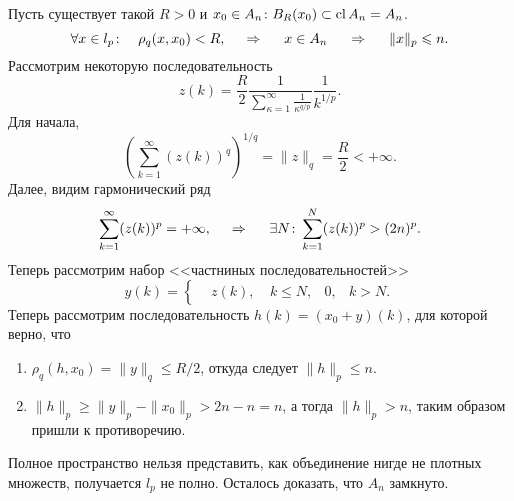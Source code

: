 Пусть существует такой $R > 0$ и $x_0 \in A_n \colon B_R (x_0) \subset \mathop{\mathrm{cl}}\nolimits A_n = A_n$. 
\begin{equation*}
    \forall x \in l_p \colon  \ \ \ 
    \rho_q (x, x_0) < R,
    \hspace{0.5cm} \Rightarrow \hspace{0.5cm}
    x \in A_n \hspace{0.5cm} \Rightarrow \hspace{0.5cm}
    \|x\|_p \leq n.
\end{equation*}
Рассмотрим некоторую последовательность
\begin{equation*}
    z(k) = \frac{R}{2} \frac{1}{\sum_{\kappa=1}^{\infty} \frac{1}{\kappa^{q/p}}} \frac{1}{k^{1/p}}.
\end{equation*}
Для начала,
\begin{equation*}
    \left(
        \sum_{k=1}^{\infty} (z(k))^{q}
    \right)^{1/q} = \|z\|_q = \frac{R}{2} < + \infty.
\end{equation*}
Далее, видим гармонический ряд
\begin{equation*}
    \sum_{k=1}^{\infty} (z(k))^p = + \infty,
    \hspace{0.5cm} \Rightarrow \hspace{0.5cm}
    \exists N  \colon  \sum_{k=1}^{N} (z(k))^p > (2n)^p.
\end{equation*}
Теперь рассмотрим набор <<частниных последовательностей>>
\begin{equation*}
    y(k) = \left\{\begin{aligned}
        &z(k), \ &k \leq N,
        &0, &k > N.
    \end{aligned}\right.
\end{equation*}
Теперь рассмотрим последовательность $h(k) = (x_0 + y) (k)$, для которой верно, что
\begin{enumerate}
    \item $\rho_q (h, x_0) = \|y\|_q \leq R/2$, откуда следует $\|h\|_p \leq n$.
    \item $\|h\|_p \geq \|y\|_p - \|x_0\|_p > 2n -n=n$, а тогда $\|h\|_p >n$, таким образом пришли к противоречию. 
\end{enumerate}

Полное пространство нельзя представить, как объединение нигде не плотных множеств, получается $l_p$ не полно. Осталось доказать, что $A_n$ замкнуто.

